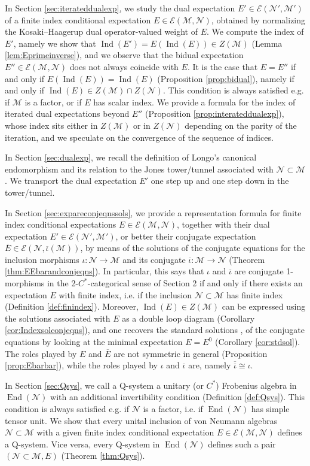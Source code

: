 \documentclass[11pt,a4paper]{article}
\makeatletter
\newcommand{\iotabar}{{\overline{\iota}}}
\newcommand{\Ebar}{{\overline{E}}}
\newcommand{\E}{\mathcal{E}}
\newcommand{\M}{\mathcal{M}}
\newcommand{\N}{\mathcal{N}}
\DeclareMathOperator{\End}{End}
\DeclareMathOperator{\Ind}{Ind}
\DeclareRobustCommand{\eg}{e.g.\@\xspace}
\DeclareRobustCommand{\ie}{i.e.\@\xspace}
\newcommand{\Cstar}{$C^\ast$\@\xspace}
\theoremstyle{plain}
\theoremstyle{definition}
\theoremstyle{remark}
\numberwithin{equation}{section}%
\makeatother
\begin{document}
In Section \ref{sec:iterateddualexp}, we study the dual expectation $E'\in\E(\N',\M')$ of a finite index conditional expectation $E\in\E(\M,\N)$, obtained by normalizing the Kosaki--Haagerup dual operator-valued weight of $E$.
We compute the index of $E'$, namely we show that $\Ind(E') = E(\Ind(E))\in Z(\M)$ (Lemma \ref{lem:Eprimeinverse}), and we observe that the bidual expectation $E''\in\E(\M,\N)$ does not always coincide with $E$. It is the case that $E=E''$ if and only if $E(\Ind(E)) = \Ind(E)$ (Proposition \ref{prop:bidual}), namely if and only if $\Ind(E) \in Z(\M)\cap Z(\N)$. This condition is always satisfied \eg if $\M$ is a factor, or if $E$ has scalar index. We provide a formula for the index of iterated dual expectations beyond $E''$ (Proposition \ref{prop:interateddualexp}), whose index sits either in $Z(\M)$ or in $Z(\N)$ depending on the parity of the iteration, and we speculate on the convergence of the sequence of indices.

In Section \ref{sec:dualexp}, we recall the definition of Longo's canonical endomorphism \cite{Lon87} and its relation to the Jones tower/tunnel associated with $\N\subset\M$. We transport the dual expectation $E'$ one step up and one step down in the tower/tunnel.

In Section \ref{sec:expareconjeqnssols}, we provide a representation formula for finite index conditional expectations $E\in\E(\M,\N)$, together with their dual expectation $E'\in\E(\N',\M')$, or better their conjugate expectation $\Ebar\in\E(\N,\iotabar(\M))$, by means of the solutions of the conjugate equations for the inclusion morphisms $\iota:\N\to\M$ and its conjugate $\iotabar:\M\to\N$ (Theorem \ref{thm:EEbarandconjeqns}). In particular, this says that $\iota$ and $\iotabar$ are conjugate 1-morphisms in the 2-\Cstar-categorical sense of Section 2 if and only if there exists an expectation $E$ with finite index, \ie if the inclusion $\N\subset\M$ has finite index (Definition \ref{def:finindex}). Moreover, $\Ind(E)\in Z(\M)$ can be expressed using the solutions associated with $E$ as a double loop diagram (Corollary \ref{cor:Indexsolconjeqns}),
and one recovers the standard solutions \cite{LoRo97}, \cite{GiLo19} of the conjugate equations by looking at the minimal expectation $E=E^0$ (Corollary \ref{cor:stdsol}).
The roles played by $E$ and $\Ebar$ are not symmetric in general (Proposition \ref{prop:Ebarbar}), while the roles played by $\iota$ and $\iotabar$ are, namely $\overline{\iotabar} \cong \iota$.

In Section \ref{sec:Qsys}, we call a Q-system a unitary (or \Cstar) Frobenius algebra in $\End(\N)$ with an additional invertibility condition (Definition \ref{def:Qsys}). This condition is always satisfied \eg if $\N$ is a factor, \ie if $\End(\N)$ has simple tensor unit. We show that every unital inclusion of von Neumann algebras $\N\subset\M$ with a given finite index conditional expectation $E\in\E(\M,\N)$ defines a Q-system. Vice versa, every Q-system in $\End(\N)$ defines such a pair $(\N\subset\M,E)$ (Theorem \ref{thm:Qsys}). 
\end{document}
